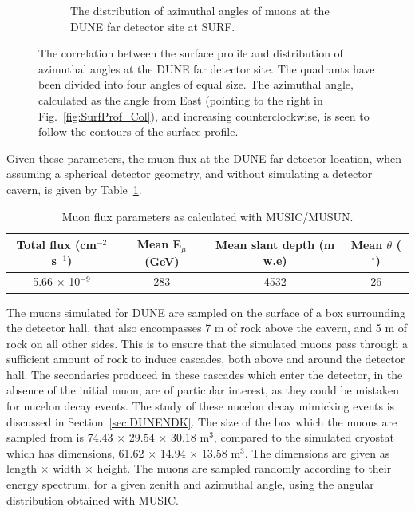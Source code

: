 \begin{figure}[h!]
\begin{subfigure}{0.45\textwidth}
    \caption{The distribution of azimuthal angles of muons at the DUNE far detector site at SURF.}
    \label{fig:SurfProf_Azi}
  \end{subfigure}
  \caption[The correlation between the surface profile and distribution of azimuthal angles at the DUNE far detector site]
          {The correlation between the surface profile and distribution of azimuthal angles at the DUNE far detector site. The quadrants have been divided into four angles of equal size. The azimuthal angle, calculated as the angle from East (pointing to the right in Fig.~\ref{fig:SurfProf_Col}), and increasing counterclockwise, is seen to follow the contours of the surface profile.}
\end{figure}

Given these parameters, the muon flux at the DUNE far detector location, when assuming a spherical detector geometry, and without simulating a detector cavern, is given by Table~\ref{tab:MUSUNflux}. \\
\begin{table}[h!]
  \caption[Muon flux parameters as calculated with MUSIC/MUSUN.]
          {Muon flux parameters as calculated with MUSIC/MUSUN.}
  \centering
  \label{tab:MUSUNflux}
  \begin{tabular}{c c c c}
    \toprule
        {Total flux (cm$^{-2}$ s$^{-1}$)} & {Mean E$_{\mu}$ (GeV)} & {Mean slant depth (m w.e)} & {Mean $\theta$ ($^{\circ}$)} \\ 
        \midrule
        5.66 $\times$ 10$^{-9}$           & 283                    & 4532                       & 26                           \\
    \bottomrule
  \end{tabular}
\end{table}

The muons simulated for DUNE are sampled on the surface of a box surrounding the detector hall, that also encompasses 7 m of rock above the cavern, and 5 m of rock on all other sides. This is to ensure that the simulated muons pass through a sufficient amount of rock to induce cascades, both above and around the detector hall. The secondaries produced in these cascades which enter the detector, in the absence of the initial muon, are of particular interest, as they could be mistaken for nucelon decay events. The study of these nucelon decay mimicking events is discussed in Section~\ref{sec:DUNENDK}. The size of the box which the muons are sampled from is 74.43 $\times$ 29.54 $\times$ 30.18 m$^3$, compared to the simulated cryostat which has dimensions, 61.62 $\times$ 14.94 $\times$ 13.58 m$^3$. The dimensions are given as length $\times$ width $\times$ height. The muons are sampled randomly according to their energy spectrum, for a given zenith and azimuthal angle, using the angular distribution obtained with MUSIC. \\

